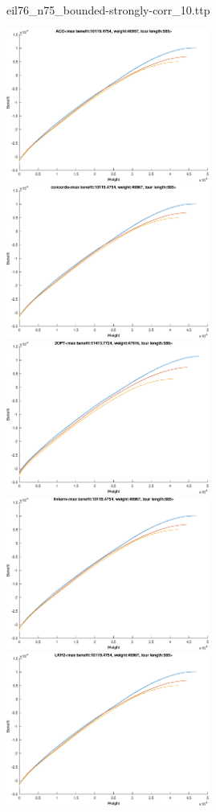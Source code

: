 \documentclass{article}
\begin{document}
\newpage
eil76\_n75\_bounded-strongly-corr\_10.ttp

\noindent
\includegraphics[width=0.5\textwidth]{eil76figs/eil76_n75_bounded-strongly-corr_10.ttp.aco.txt.atsf.eps}
\includegraphics[width=0.5\textwidth]{eil76figs/eil76_n75_bounded-strongly-corr_10.ttp.con.txt.atsf.eps}
\includegraphics[width=0.5\textwidth]{eil76figs/eil76_n75_bounded-strongly-corr_10.ttp.inv.txt.atsf.eps}
\includegraphics[width=0.5\textwidth]{eil76figs/eil76_n75_bounded-strongly-corr_10.ttp.lkh.txt.atsf.eps}
\includegraphics[width=0.5\textwidth]{eil76figs/eil76_n75_bounded-strongly-corr_10.ttp.lkh2.txt.atsf.eps}
\end{document}
